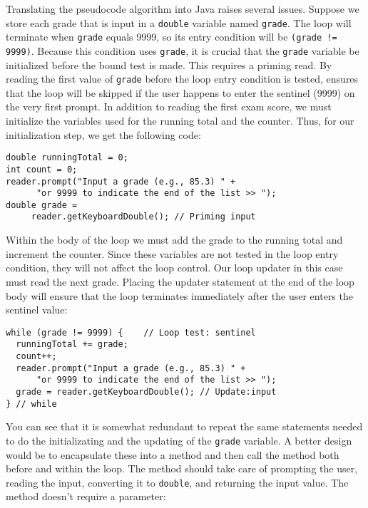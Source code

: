 Translating the pseudocode algorithm into Java raises several issues.
Suppose we store each grade that is input in a {\tt double} variable
named {\tt grade}.  The loop will terminate when {\tt grade} equals
9999, so its entry condition will be {\tt (grade != 9999)}. Because
this condition uses {\tt grade}, it is crucial that the {\tt grade}
variable be initialized before the bound test is made.  This requires
a priming read. By reading the first value of {\tt grade} before the
loop entry condition is tested, ensures that the loop will be skipped
if the user happens to enter the sentinel (9999) on the very first
prompt. In addition to reading the first exam score, we must
initialize the variables used for the running total and the
counter. Thus, for our initialization step, we get the following code:

\begin{jjjlisting}
\begin{lstlisting}
double runningTotal = 0;
int count = 0;
reader.prompt("Input a grade (e.g., 85.3) " +
      "or 9999 to indicate the end of the list >> ");
double grade = 
     reader.getKeyboardDouble(); // Priming input
\end{lstlisting}
\end{jjjlisting}

\noindent Within the body of the loop we must add the grade to the
running total and increment the counter. Since these variables are not
tested in the loop entry condition, they will not affect the loop
control.  Our loop updater in this case must read the next
grade. Placing the updater statement at the end of the
loop body will ensure that the loop terminates immediately after the
user enters the sentinel value:

\begin{jjjlisting}
\begin{lstlisting}
while (grade != 9999) {    // Loop test: sentinel
  runningTotal += grade;                            
  count++;                                          
  reader.prompt("Input a grade (e.g., 85.3) " +
      "or 9999 to indicate the end of the list >> ");
  grade = reader.getKeyboardDouble(); // Update:input
} // while
\end{lstlisting}
\end{jjjlisting}

\noindent You can see that it is somewhat redundant to repeat the same 
statements needed to do the initializating and the updating of
the {\tt grade} variable. A better design would be to encapsulate
these into a method and then call the method both before and within
the loop.  The method should take care of prompting the user, reading
the input, converting it to {\tt double}, and returning the input
value. The method doesn't require a parameter:

